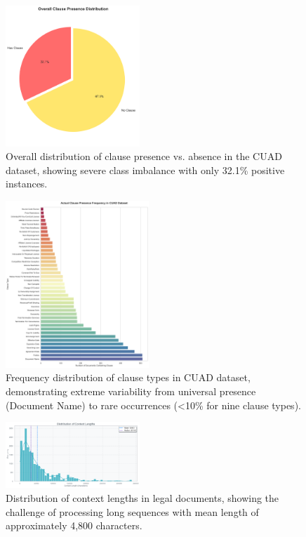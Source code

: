 \begin{figure}[htbp]
\centering
\includegraphics[width=0.45\textwidth]{../figures/clause_presence_distribution.png}
\caption{Overall distribution of clause presence vs. absence in the CUAD dataset, showing severe class imbalance with only 32.1\% positive instances.}
\label{fig:clause_presence_distribution}
\end{figure}

\begin{figure}[htbp]
\centering
\includegraphics[width=0.48\textwidth]{../figures/clause_presence_frequency.png}
\caption{Frequency distribution of clause types in CUAD dataset, demonstrating extreme variability from universal presence (Document Name) to rare occurrences (<10\% for nine clause types).}
\label{fig:clause_presence_frequency}
\end{figure}

\begin{figure}[htbp]
\centering
\includegraphics[width=0.45\textwidth]{../figures/context_lengths_distribution.png}
\caption{Distribution of context lengths in legal documents, showing the challenge of processing long sequences with mean length of approximately 4,800 characters.}
\label{fig:context_lengths_distribution}
\end{figure}

